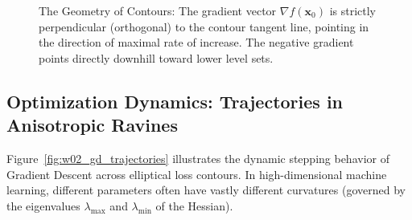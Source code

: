 \begin{figure}[htbp]
\caption{The Geometry of Contours: The gradient vector $\nabla f(\mathbf{x}_0)$ is strictly perpendicular (orthogonal) to the contour tangent line, pointing in the direction of maximal rate of increase. The negative gradient points directly downhill toward lower level sets.}
\label{fig:contour_geometry}
\end{figure}

\subsection{Optimization Dynamics: Trajectories in Anisotropic Ravines}
Figure~\ref{fig:w02_gd_trajectories} illustrates the dynamic stepping behavior of Gradient Descent across elliptical loss contours. In high-dimensional machine learning, different parameters often have vastly different curvatures (governed by the eigenvalues $\lambda_{\max}$ and $\lambda_{\min}$ of the Hessian).

